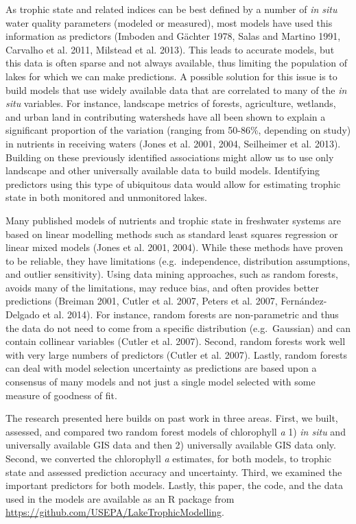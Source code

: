 \documentclass[12pt,]{article}
\begin{document}
As trophic state and related indices can be best defined by a number of
\emph{in situ} water quality parameters (modeled or measured), most
models have used this information as predictors (Imboden and G{ä}chter
1978, Salas and Martino 1991, Carvalho et al. 2011, Milstead et al.
2013). This leads to accurate models, but this data is often sparse and
not always available, thus limiting the population of lakes for which we
can make predictions. A possible solution for this issue is to build
models that use widely available data that are correlated to many of the
\emph{in situ} variables. For instance, landscape metrics of forests,
agriculture, wetlands, and urban land in contributing watersheds have
all been shown to explain a significant proportion of the variation
(ranging from 50-86\%, depending on study) in nutrients in receiving
waters (Jones et al. 2001, 2004, Seilheimer et al. 2013). Building on
these previously identified associations might allow us to use only
landscape and other universally available data to build models.
Identifying predictors using this type of ubiquitous data would allow
for estimating trophic state in both monitored and unmonitored lakes.

Many published models of nutrients and trophic state in freshwater
systems are based on linear modelling methods such as standard least
squares regression or linear mixed models (Jones et al. 2001, 2004).
While these methods have proven to be reliable, they have limitations
(e.g.~independence, distribution assumptions, and outlier sensitivity).
Using data mining approaches, such as random forests, avoids many of the
limitations, may reduce bias, and often provides better predictions
(Breiman 2001, Cutler et al. 2007, Peters et al. 2007, Fernández-Delgado
et al. 2014). For instance, random forests are non-parametric and thus
the data do not need to come from a specific distribution
(e.g.~Gaussian) and can contain collinear variables (Cutler et al.
2007). Second, random forests work well with very large numbers of
predictors (Cutler et al. 2007). Lastly, random forests can deal with
model selection uncertainty as predictions are based upon a consensus of
many models and not just a single model selected with some measure of
goodness of fit.

The research presented here builds on past work in three areas. First,
we built, assessed, and compared two random forest models of chlorophyll
\emph{a} 1) \emph{in situ} and universally available GIS data and then
2) universally available GIS data only. Second, we converted the
chlorophyll \emph{a} estimates, for both models, to trophic state and
assessed prediction accuracy and uncertainty. Third, we examined the
important predictors for both models. Lastly, this paper, the code, and
the data used in the models are available as an R package from
\url{https://github.com/USEPA/LakeTrophicModelling}.
\end{document}
